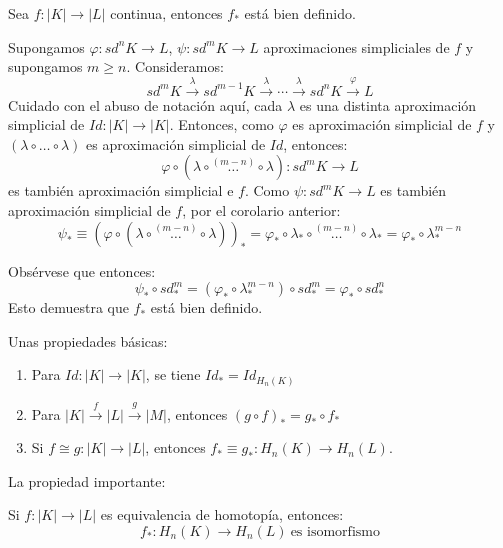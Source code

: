 \documentclass[HS.tex]{subfiles}
\begin{document}
\begin{coro}
Sea $f \colon |K| \to |L|$ continua, entonces $f_*$ está bien definido.
\end{coro}
\begin{dem}
Supongamos $\varphi \colon sd^n K \to L$, $\psi \colon sd^m K \to L$ aproximaciones simpliciales de $f$ y supongamos $m \geq n$.
Consideramos:
\[ sd^m K \xrightarrow{\lambda} sd^{m-1} K \xrightarrow{\lambda} \cdots\xrightarrow{\lambda} sd^n K \xrightarrow{\varphi} L \]
Cuidado con el abuso de notación aquí, cada $\lambda$ es una distinta aproximación simplicial de $Id \colon |K| \to |K|$.
Entonces, como $\varphi$ es aproximación simplicial de $f$ y $(\lambda \circ \dots \circ \lambda)$ es aproximación simplicial de $Id$, entonces:
\[ \varphi \circ (\lambda \circ \overset{(m-n)}{\dots} \circ \lambda) \colon sd^m K \to L\]
es también aproximación simplicial e $f$.
Como $\psi \colon sd^m K \to L$ es también aproximación simplicial de $f$, por el corolario anterior:
\[ \psi_* \equiv (\varphi \circ (\lambda\circ\overset{(m-n)}{\dots} \circ \lambda))_* = \varphi_* \circ \lambda_* \circ \overset{(m-n)}{\dots}\circ \lambda_* = \varphi_* \circ \lambda_*^{m-n}\]

Obsérvese que entonces:
\[ \psi_* \circ sd_*^m = (\varphi_* \circ \lambda_*^{m-n}) \circ sd_*^m =  \varphi_* \circ sd_*^n \]
Esto demuestra que $f_*$ está bien definido.
\end{dem}

Unas propiedades básicas:
\begin{propi}\mbox{}
\begin{enumerate}
	\item Para $Id \colon |K| \to |K|$, se tiene $Id_* = Id_{H_n(K)}$
	\item Para $|K| \xrightarrow{f} |L| \xrightarrow{g} |M|$, entonces $(g \circ f)_* = g_* \circ f_*$
	\item Si $f \cong g\colon |K| \to |L|$, entonces $f_* \equiv g_* \colon H_n(K) \to H_n(L)$.
\end{enumerate}
\end{propi}
La propiedad importante:
\begin{coro}
Si $f \colon |K| \to |L|$ es equivalencia de homotopía, entonces:
\[ f_* \colon H_n(K) \to H_n(L) \ \text{es isomorfismo}\]
\end{coro}
\end{document}
